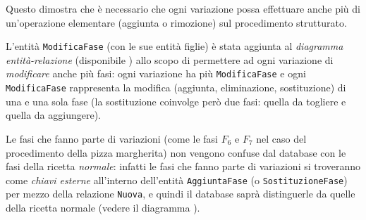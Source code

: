 Questo dimostra che è necessario che ogni variazione possa effettuare anche più di un'operazione
elementare (aggiunta o rimozione) sul procedimento strutturato.

L'entità {\tt ModificaFase} (con le sue entità figlie) è stata aggiunta al {\it diagramma
entità-relazione} (disponibile ) allo scopo di permettere
ad ogni variazione di {\it modificare} anche più fasi: ogni variazione ha più
{\tt ModificaFase} e ogni {\tt ModificaFase} rappresenta la modifica (aggiunta, eliminazione, sostituzione)
di una e una sola fase (la sostituzione coinvolge però due fasi: quella da togliere e quella da aggiungere).

Le fasi che fanno parte di variazioni (come le fasi $F_{6}$ e $F_{7}$ nel caso del procedimento
della pizza margherita) non vengono confuse dal database con le fasi della ricetta {\it normale}:
infatti le fasi che fanno parte di variazioni si troveranno come {\it chiavi esterne}
all'interno dell'entità {\tt AggiuntaFase} (o {\tt SostituzioneFase}) per mezzo della relazione
{\tt Nuova}, e quindi il database saprà distinguerle da quelle della ricetta normale
(vedere il diagramma ).
